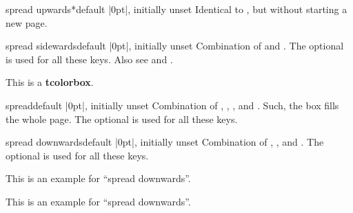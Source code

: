 \begin{docTcbKey}[][doc new=2017-02-13]{spread upwards*}{}{default |0pt|, initially unset}
Identical to , but without starting a new page.
\end{docTcbKey}


\begin{docTcbKey}[][doc new=2017-02-13]{spread sidewards}{}{default |0pt|, initially unset}
Combination of  and .
The optional  is used for all these keys.
Also see  and .
\begin{dispListing}
\begin{tcolorbox}[enhanced,spread sidewards,
  colframe=blue!75!black,colback=white,show bounding box]
This is a \textbf{tcolorbox}.
\end{tcolorbox}
\end{dispListing}
{\tcbusetemp}
\end{docTcbKey}


\begin{docTcbKey}[][doc new=2017-02-13]{spread}{}{default |0pt|, initially unset}
Combination of
, , ,
and .
Such, the box fills the whole page.
The optional  is used for all these keys.
\end{docTcbKey}


\begin{docTcbKey}[][doc new=2017-02-13]{spread downwards}{}{default |0pt|, initially unset}
Combination of
, , and .
The optional  is used for all these keys.
\begin{dispListing}
\begin{tcolorbox}[enhanced,spread downwards,sharp corners=south,
  colframe=red!75!black,interior style={top color=white,bottom color=red!50}]
This is an example for ``spread downwards''.
\end{tcolorbox}
\end{dispListing}
\end{docTcbKey}
\begin{tcolorbox}[enhanced,spread downwards,sharp corners=south,
  colframe=red!75!black,interior style={top color=white,bottom color=red!50}]
This is an example for ``spread downwards''.
\end{tcolorbox}




